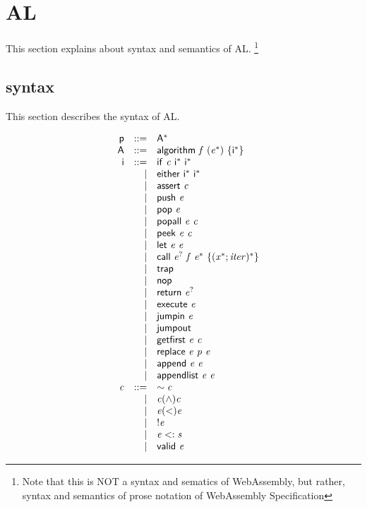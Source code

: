 \section{AL}\label{sec:al}

This section explains about syntax and semantics of AL.
\footnote{Note that this is NOT a syntax and sematics of WebAssembly, but rather,
syntax and semantics of prose notation of WebAssembly Specification}

\subsection{syntax}

This section describes the syntax of AL.

\begin{minipage}{0.5\textwidth}
$$
\begin{array}{@{}lrrl@{}}
& \mathsf{p} &::=& {\mathsf{A}^\ast} \\
& \mathsf{A} &::=& \mathsf{algorithm}~\mathit{f}~({\mathit{e}^\ast})~\{{\mathsf{i}^\ast}\} \\
& \mathsf{i} &::=& \mathsf{if}~\mathit{c}~{\mathsf{i}^\ast}~{\mathsf{i}^\ast} \\ &&|&
\mathsf{either}~{\mathsf{i}^\ast}~{\mathsf{i}^\ast} \\ &&|&
\mathsf{assert}~\mathit{c} \\ &&|&
\mathsf{push}~\mathit{e} \\ &&|&
\mathsf{pop}~\mathit{e} \\ &&|&
\mathsf{popall}~\mathit{e}~\mathit{c} \\ &&|&
\mathsf{peek}~\mathit{e}~\mathit{c} \\ &&|&
\mathsf{let}~\mathit{e}~\mathit{e} \\ &&|&
\mathsf{call}~{\mathit{e}^?}~\mathit{f}~{\mathit{e}^\ast}~\{{({\mathit{x}^\ast} ; \mathit{iter})^\ast}\} \\ &&|&
\mathsf{trap} \\ &&|&
\mathsf{nop} \\ &&|&
\mathsf{return}~{\mathit{e}^?} \\ &&|&
\mathsf{execute}~\mathit{e} \\ &&|&
\mathsf{jumpin}~\mathit{e} \\ &&|&
\mathsf{jumpout} \\ &&|&
\mathsf{getfirst}~\mathit{e}~\mathit{c} \\ &&|&
\mathsf{replace}~\mathit{e}~\mathit{p}~\mathit{e} \\ &&|&
\mathsf{append}~\mathit{e}~\mathit{e} \\ &&|&
\mathsf{appendlist}~\mathit{e}~\mathit{e} \\
& \mathit{c} &::=& \sim\mathit{c} \\ &&|&
\mathit{c}(\wedge)\mathit{c} \\ &&|&
\mathit{e}(<)\mathit{e} \\ &&|&
!\mathit{e} \\ &&|&
\mathit{e}<:\mathit{s} \\ &&|&
\mathsf{valid}~\mathit{e} \\
\end{array}
$$
\end{minipage}
